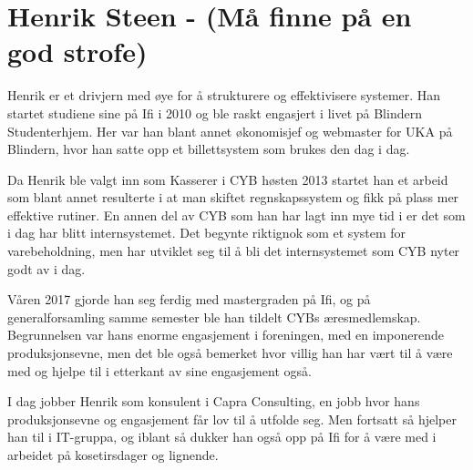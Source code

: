\chapter[Henrik Steen]{Henrik Steen - (Må finne på en god strofe)}

Henrik er et drivjern med øye for å strukturere og effektivisere systemer. Han startet studiene sine på Ifi i 2010 og ble raskt engasjert i livet på Blindern Studenterhjem. Her var han blant annet økonomisjef og webmaster for UKA på Blindern, hvor han satte opp et billettsystem som brukes den dag i dag.

Da Henrik ble valgt inn som Kasserer i CYB høsten 2013 startet han et arbeid som blant annet resulterte i at man skiftet regnskapssystem og fikk på plass mer effektive rutiner. En annen del av CYB som han har lagt inn mye tid i er det som i dag har blitt internsystemet. Det begynte riktignok som et system for varebeholdning, men har utviklet seg til å bli det internsystemet som CYB nyter godt av i dag.

Våren 2017 gjorde han seg ferdig med mastergraden på Ifi, og på generalforsamling samme semester ble han tildelt CYBs æresmedlemskap. Begrunnelsen var hans enorme engasjement i foreningen, med en imponerende produksjonsevne, men det ble også bemerket hvor villig han har vært til å være med og hjelpe til i etterkant av sine engasjement også.

I dag jobber Henrik som konsulent i Capra Consulting, en jobb hvor hans produksjonsevne og engasjement får lov til å utfolde seg. Men fortsatt så hjelper han til i IT-gruppa, og iblant så dukker han også opp på Ifi for å være med i arbeidet på kosetirsdager og lignende.
